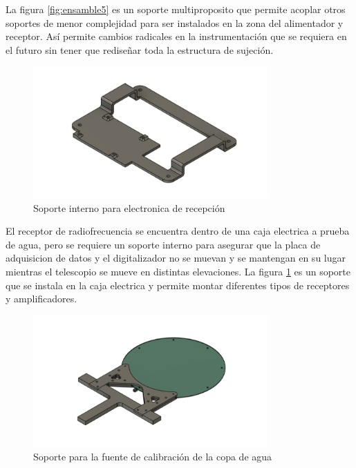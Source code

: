 La figura \ref{fig:ensamble5} es un soporte multiproposito que permite acoplar otros soportes de menor complejidad para ser instalados en la zona del alimentador y receptor. Así permite cambios radicales en la instrumentación que se requiera en el futuro sin tener que rediseñar toda la estructura de sujeción.\\

\begin{figure}
    \centering
    \includegraphics[width=0.8\textwidth]{img/soporte3D7}
    \caption{Soporte interno para electronica de recepción}
    \label{fig:ensamble6}
\end{figure}

El receptor de radiofrecuencia se encuentra dentro de una caja electrica a prueba de agua, pero se requiere un soporte interno para asegurar que la placa de adquisicion de datos y el digitalizador no se muevan y se mantengan en su lugar mientras el telescopio se mueve en distintas elevaciones. La figura \ref{fig:ensamble6} es un soporte que se instala en la caja electrica y permite montar diferentes tipos de receptores y amplificadores.\\

\begin{figure}
    \centering
    \includegraphics[width=0.8\textwidth]{img/soporte3D4}
    \caption{Soporte para la fuente de calibración de la copa de agua }
    \label{fig:ensamble7}
\end{figure}

